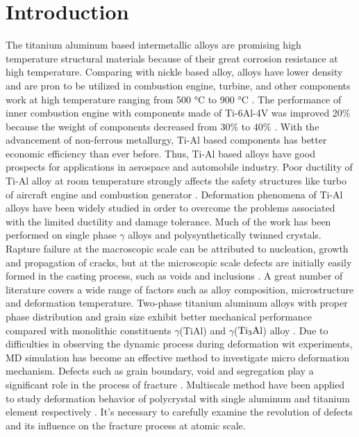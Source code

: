 \documentclass[Unknown,article,submit,moreauthors,pdftex,10pt,a4paper]{Definitions/mdpi}
\begin{document}
\section{Introduction}
The titanium  aluminum based intermetallic alloys are promising high temperature structural materials because of their great corrosion resistance at high temperature. Comparing with nickle based alloy,  alloys have lower density and are pron to be utilized in combustion engine, turbine, and other components work at high temperature ranging from 500 \si{\degreeCelsius} to 900 \si{\degreeCelsius} \cite{Clemens2016}. The performance of inner combustion engine with components made of Ti-6Al-4V was improved  20\% because the weight of components decreased from 30\% to 40\% \cite{Bewlay2016}. With the advancement of non-ferrous metallurgy, Ti-Al based components has better economic efficiency than ever before. Thus, Ti-Al based alloys have good prospects for applications in aerospace and automobile industry. 
Poor ductility of Ti-Al alloy  at room temperature strongly affects the safety structures like turbo of aircraft engine and combustion generator \cite{Munz2017}. Deformation phenomena of Ti-Al alloys have been widely studied in order to overcome the problems associated with the limited ductility and damage tolerance.  Much of the work has been performed on single phase $\gamma$ alloys and polysynthetically twinned crystals\cite{Appel2016}. Rapture failure at the macroscopic scale can be attributed to nucleation, growth and propagation of cracks, but at the microscopic scale defects are initially easily formed in the casting process, such as voids and inclusions \cite{Tang2014}. A great number of literature covers a wide range of factors such as alloy composition, microstructure and deformation temperature. Two-phase titanium aluminum alloys with proper phase distribution and grain size exhibit better mechanical performance compared with monolithic constituents $\gamma$(TiAl) and $\gamma$($\rm Ti_3Al$) alloy \cite{Kim1995}. Due to difficulties in observing the dynamic process during deformation wit experiments, MD simulation has become an effective method to investigate micro deformation mechanism. Defects such as grain boundary, void and segregation play a significant role in the process of fracture \cite{Larsen2016}. Multiscale method have been applied to study deformation behavior of polycrystal with single aluminum \cite{Groh2009} and titanium element respectively \cite{Liu2018}. It's necessary to carefully examine the revolution of defects and its influence on the fracture process at atomic scale. 
\end{document}
